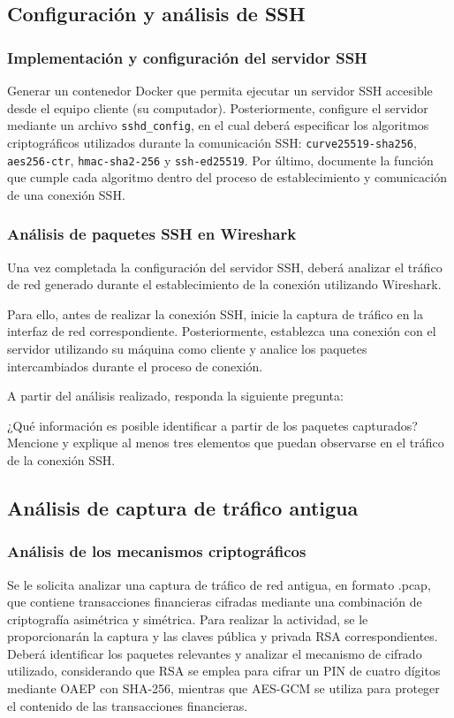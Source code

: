 \documentclass[letter,12pt]{article}
\begin{document}
\subsection{Configuración y análisis de SSH}
\subsubsection{Implementación y configuración del servidor SSH}

    Generar un contenedor Docker que permita ejecutar un servidor SSH accesible desde el equipo cliente (su computador). Posteriormente, configure el servidor mediante un archivo \texttt{sshd\_config}, en el cual deberá especificar los algoritmos criptográficos utilizados durante la comunicación SSH: \texttt{curve25519-sha256}, \texttt{aes256-ctr}, \texttt{hmac-sha2-256} y \texttt{ssh-ed25519}. Por último, documente la función que cumple cada algoritmo dentro del proceso de establecimiento y comunicación de una conexión SSH.


\subsubsection{Análisis de paquetes SSH en Wireshark}

    Una vez completada la configuración del servidor SSH, deberá analizar el tráfico de red generado durante el establecimiento de la conexión utilizando Wireshark.

    Para ello, antes de realizar la conexión SSH, inicie la captura de tráfico en la interfaz de red correspondiente. Posteriormente, establezca una conexión con el servidor utilizando su máquina como cliente y analice los paquetes intercambiados durante el proceso de conexión.

    A partir del análisis realizado, responda la siguiente pregunta:

    ¿Qué información es posible identificar a partir de los paquetes capturados? Mencione y explique al menos tres elementos que puedan observarse en el tráfico de la conexión SSH.


\subsection{Análisis de captura de tráfico antigua}

\subsubsection{Análisis de los mecanismos criptográficos}
Se le solicita analizar una captura de tráfico de red antigua, en formato .pcap, que contiene transacciones financieras cifradas mediante una combinación de criptografía asimétrica y simétrica. Para realizar la actividad, se le proporcionarán la captura y las claves pública y privada RSA correspondientes. Deberá identificar los paquetes relevantes y analizar el mecanismo de cifrado utilizado, considerando que RSA se emplea para cifrar un PIN de cuatro dígitos mediante OAEP con SHA-256, mientras que AES-GCM se utiliza para proteger el contenido de las transacciones financieras.
\end{document}
